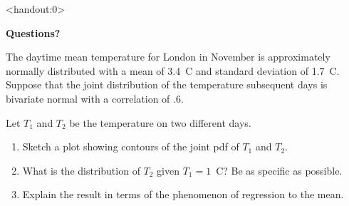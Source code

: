 \begin{frame}<handout:0>
  \begin{center}
    \Huge{\textbf{Questions?}}
  \end{center}
\end{frame}

\begin{frame}

\begin{block}
The daytime mean temperature for London in November is approximately normally distributed with a mean of 3.4~C and standard deviation of 1.7~C. Suppose that the joint distribution of the temperature subsequent days is bivariate normal with a correlation of $.6$. 

Let $T_1$ and $T_2$ be the temperature on two different days.

\begin{enumerate}
\item Sketch a plot showing contours of the joint pdf of $T_1$ and $T_2$. 
\item What is the distribution of $T_2$ given $T_1=1$~C? Be as specific as possible.
\item Explain the result in terms of the phenomenon of regression to the mean. 
\end{enumerate}
\end{block}

\end{frame}

